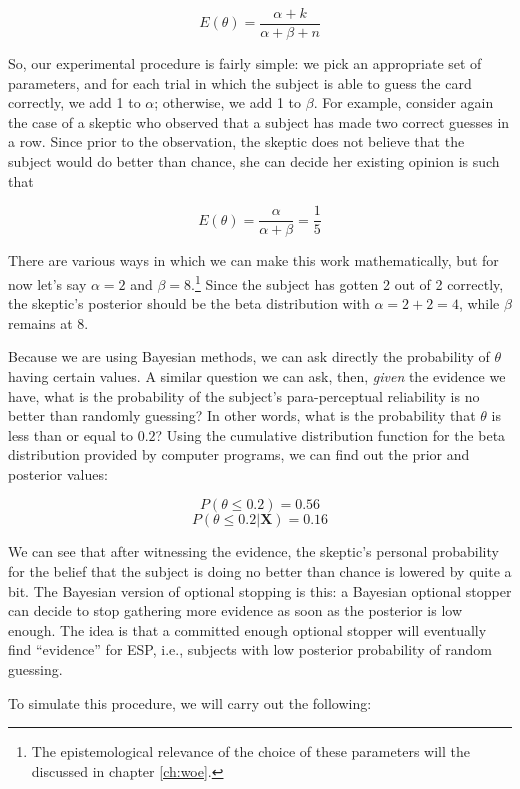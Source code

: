 \[E(\theta) = \frac{\alpha + k}{\alpha + \beta + n}\]

So, our experimental procedure is fairly simple: we pick an appropriate
set of parameters, and for each trial in which the subject is able to
guess the card correctly, we add 1 to \(\alpha\); otherwise, we add 1 to
\(\beta\). For example, consider again the case of a skeptic who
observed that a subject has made two correct guesses in a row. Since
prior to the observation, the skeptic does not believe that the subject
would do better than chance, she can decide her existing opinion is such that

\[E(\theta) = \frac{\alpha}{\alpha + \beta} = \frac{1}{5}\]

There are various ways in which we can make this work mathematically,
but for now let's say \(\alpha = 2\) and \(\beta = 8\).\footnote{The epistemological relevance of the choice of these parameters will the discussed in chapter \ref{ch:woe}.} Since the
subject has gotten 2 out of 2 correctly, the skeptic's posterior should
be the beta distribution with \(\alpha= 2+2=4\), while \(\beta\) remains
at 8.

Because we are using Bayesian methods, we can ask directly the
probability of \(\theta\) having certain values. A similar question we
can ask, then, \emph{given} the evidence we have, what is the
probability of the subject's para-perceptual reliability is no better
than randomly guessing? In other words, what is the probability that
\(\theta\) is less than or equal to \(0.2\)? Using the cumulative
distribution function for the beta distribution provided by computer programs, we can find out the prior and posterior values:

\[P(\theta \leq 0.2) = 0.56\] \[P(\theta \leq 0.2|\mathbf{X}) = 0.16\]

We can see that after witnessing the evidence, the skeptic's personal
probability for the belief that the subject is doing no better than
chance is lowered by quite a bit. The Bayesian version of optional
stopping is this: a Bayesian optional stopper can decide to stop
gathering more evidence as soon as the posterior is low enough. The idea
is that a committed enough optional stopper will eventually find
``evidence'' for ESP, i.e., subjects with low posterior probability of
random guessing.

To simulate this procedure, we will carry out the following:



